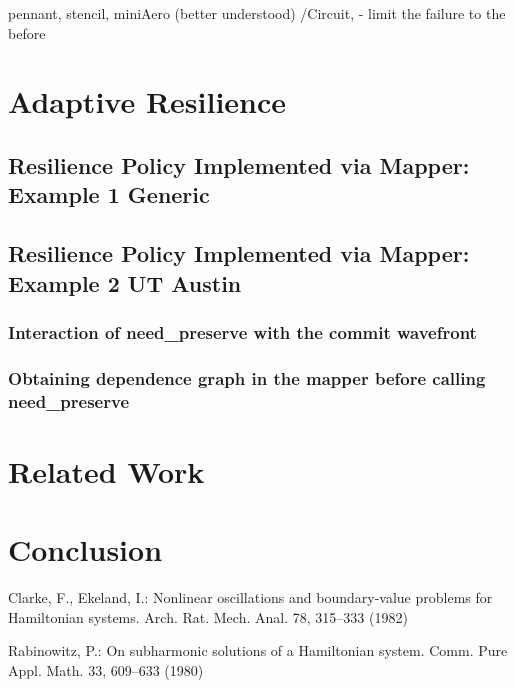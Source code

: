 \documentclass{llncs}
\begin{document}
pennant, stencil, miniAero (better understood) /Circuit, 
- limit the failure to the before

\section{Adaptive Resilience}

\subsection{Resilience Policy Implemented via Mapper: Example 1 Generic}

\subsection{Resilience Policy Implemented via Mapper: Example 2 UT Austin}
\subsubsection{Interaction of need\_preserve with the commit wavefront}
\subsubsection{Obtaining dependence graph in the mapper before calling need\_preserve} 

\section{Related Work}

\section{Conclusion}

%
%

\begin{thebibliography}{5}
%
Clarke, F., Ekeland, I.:
Nonlinear oscillations and
boundary-value problems for Hamiltonian systems.
Arch. Rat. Mech. Anal. 78, 315--333 (1982)

Rabinowitz, P.:
On subharmonic solutions of a Hamiltonian system.
Comm. Pure Appl. Math. 33, 609--633 (1980)

\end{thebibliography}

\clearpage
%
\end{document}
